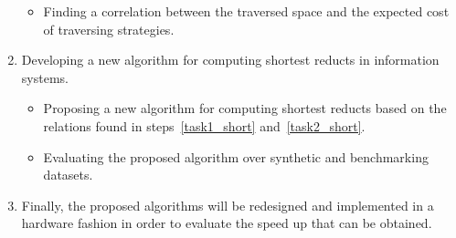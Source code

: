 \documentclass[authoryear,11pt]{elsarticle}
\begin{document}
\begin{enumerate}
\begin{itemize}
  		\item Finding a correlation between the traversed space and the expected cost of traversing strategies.
  	\end{itemize}
  	\item Developing a new algorithm for computing shortest reducts in information systems.
  	\begin{itemize}
  		\item Proposing a new algorithm for computing shortest reducts based on the relations found in 
  			  steps~\ref{task1_short} and~\ref{task2_short}.
  		\item Evaluating the proposed algorithm over synthetic and benchmarking datasets.
  	\end{itemize}
  	\item Finally, the proposed algorithms will be redesigned and implemented in a hardware fashion in order to 
  		  evaluate the speed up that can be obtained.
\end{enumerate}

\clearpage 
\end{document}
